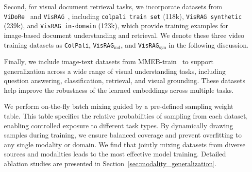 Second, for visual document retrieval tasks, we incorporate datasets from \texttt{ViDoRe}~\citep{colpali} and \texttt{VisRAG}~\citep{visrag}, including \texttt{colpali train set} (118k), \texttt{VisRAG synthetic} (239k), and \texttt{VisRAG in-domain} (123k), which provide training examples for image-based document understanding and retrieval. We denote these three video training datasets as \texttt{ColPali}, \texttt{VisRAG$_{\text{ind}}$}, and \texttt{VisRAG$_{\text{syn}}$} in the following discussion.


Finally, we include image-text datasets from MMEB-train~\citep{vlm2vec} to support generalization across a wide range of visual understanding tasks, including question answering, classification, retrieval, and visual grounding. These datasets help improve the robustness of the learned embeddings across multiple tasks.

We perform on-the-fly batch mixing guided by a pre-defined sampling weight table. This table specifies the relative probabilities of sampling from each dataset, enabling controlled exposure to different task types. By dynamically drawing samples during training, we ensure balanced coverage and prevent overfitting to any single modality or domain. We find that jointly mixing datasets from diverse sources and modalities leads to the most effective model training. Detailed ablation studies are presented in Section~\ref{sec:modality_generalization}. 




